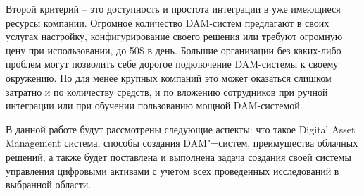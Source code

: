 Второй критерий – это доступность и простота интеграции в уже имеющиеся ресурсы компании. Огромное количество DAM-систем предлагают в своих услугах настройку, конфигурирование своего решения или требуют огромную цену при использовании, до 50\$ в день. Большие организации без каких-либо проблем могут позволить себе дорогое подключение DAM-системы к своему окружению. Но для менее крупных компаний это может оказаться слишком затратно и по количеству средств, и по вложению сотрудников при ручной интеграции или при обучении пользованию мощной DAM-системой.

В данной работе будут рассмотрены следующие аспекты: что такое Digital Asset Management система, способы создания DAM"=систем, преимущества облачных решений, а также будет поставлена и выполнена задача создания своей системы управления цифровыми активами с учетом всех проведенных исследований в выбранной области.
